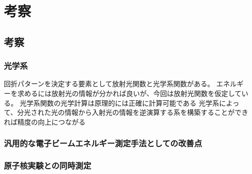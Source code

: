 \documentclass[a4paper,11pt,uplatex]{jsbook}
\begin{document}
\chapter{考察}
\section{考察}
\subsection{光学系}
回折パターンを決定する要素として放射光関数と光学系関数がある。
エネルギーを求めるには放射光の情報が分かれば良いが、今回は放射光関数を仮定している。
光学系関数の光学計算は原理的には正確に計算可能である
光学系によって、分光された光の情報から入射光の情報を逆演算する系を構築することができれば精度の向上につながる

\subsection{汎用的な電子ビームエネルギー測定手法としての改善点}

\subsection{原子核実験との同時測定}
\end{document}
